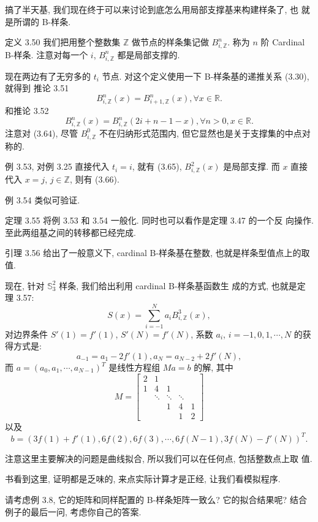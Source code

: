 \documentclass[a4paper]{ctexart}
\begin{document}
{搞了半天基, 我们现在终于可以来讨论到底怎么用局部支撑基来构建样条了, 也
就是所谓的 B-样条.

定义 3.50 我们把用整个整数集 $\mathbb{Z}$ 做节点的样条集记做 $B_{i,
  \mathbb{Z}}^n$. 称为 $n$ 阶 Cardinal B-样条. 注意对每一个 $i$, $B_{i,
  \mathbb{Z}}^n$ 都是局部支撑的.

现在两边有了无穷多的 $t_i$ 节点. 对这个定义使用一下 B-样条基的递推关系 (3.30), 就得到
推论 3.51
$$
B_{i, \mathbb{Z}}^n(x) = B_{i + 1, \mathbb{Z}}^n(x), \forall x \in \mathbb{R}.
$$
和推论 3.52
$$
B_{i, \mathbb{Z}}^n(x) = B_{i, \mathbb{Z}}^n(2i + n - 1 - x), \forall n > 0, x \in \mathbb{R}.
$$
注意对 (3.64), 尽管 $B_{i, \mathbb{Z}}^0$ 不在归纳形式范围内, 但它显然也是关于支撑集的中点对称的.

例 3.53, 对例 3.25 直接代入 $t_i = i$, 就有 (3.65), $B_{i,
  \mathbb{Z}}^2(x)$ 是局部支撑. 而 $x$ 直接代入 $x = j$, $j \in
\mathbb{Z}$, 则有 (3.66).

例 3.54 类似可验证.

定理 3.55 将例 3.53 和 3.54 一般化. 同时也可以看作是定理 3.47 的一个反
向操作. 至此两组基之间的转移都已经完成.

引理 3.56 给出了一般意义下, cardinal B-样条基在整数, 也就是样条型值点上的取值.

现在, 针对 $\mathbb{S}_3^2$ 样条, 我们给出利用 cardinal B-样条基函数生
成的方式, 也就是定理 3.57:
$$
S(x) = \sum_{i = -1}^N a_i B_{i, \mathbb{Z}}^3(x),
$$
对边界条件 $S'(1) = f'(1)$, $S'(N) = f'(N)$,
系数 $a_i$, $i = -1, 0, 1, \cdots, N$ 的获得方式是:
$$
a_{-1} = a_1 - 2 f'(1), a_N = a_{N - 2} + 2 f'(N),
$$
而 $a = (a_0, a_1, \cdots, a_{N - 1})^T$ 是线性方程组 $M a = b$ 的解, 其中
$$
M = \left[
  \begin{array}{ccccc}
    2 & 1 &&& \\
    1 & 4 & 1 &&\\
    & \ddots & \ddots & \ddots & \\
    && 1 & 4 & 1\\
    &&& 1 & 2
  \end{array}
  \right]
$$
以及
$$
b = \left(3 f(1) + f'(1), 6 f(2), 6 f (3), \cdots, 6 f(N - 1), 3
f(N) - f'(N) \right)^T.
$$

注意这里主要解决的问题是曲线拟合, 所以我们可以在任何点, 包括整数点上取
值.

书看到这里, 证明都是乏味的, 来点实际计算才是正经, 让我们看模拟程序.

请考虑例 3.8, 它的矩阵和同样配置的 B-样条矩阵一致么? 它的拟合结果呢?
结合例子的最后一问, 考虑你自己的答案.

}
\end{document}
